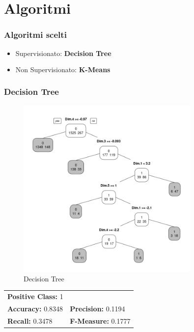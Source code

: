 \section{Algoritmi}
\begin{frame}[fragile]
\frametitle{Algoritmi scelti}
\begin{itemize}
    \item Supervisionato: \textbf{Decision Tree} 
    \item Non Supervisionato: \textbf{K-Means} 
\end{itemize}
\end{frame}

\begin{frame}[fragile]
\frametitle{Decision Tree}
\begin{minipage}{0.45\textwidth}
\begin{figure}
    \centering
    \includegraphics[width=0.8\textwidth]{Img/decision tree/D-TREE001.png}
    \caption{Decision Tree}
    \label{fig:DTREE1}
\end{figure}
\end{minipage}%
\hspace{2em}
\begin{minipage}{0.45\textwidth}

\begin{table}[h!]
\centering
\begin{tabular}{ll}
\multicolumn{2}{l}{\textbf{Positive Class:} 1} \\
\textbf{Accuracy:} 0.8348 & \textbf{Precision:} 0.1194\\
\textbf{Recall:} 0.3478 & \textbf{F-Measure:} 0.1777
\end{tabular}
\end{table}
\end{minipage}%
\end{frame}

